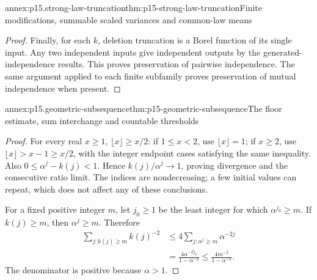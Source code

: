 \begin{annexitem}{annex:p15.strong-law-truncation}{thm:p15-strong-law-truncation}{Finite modifications, summable scaled variances and common-law means}
\begin{proof}
Finally, for each \(k\), deletion truncation is a Borel function
of its single input. Any two independent inputs give independent
outputs by the generated-independence results. This proves preservation
of pairwise independence. The same argument applied to each finite
subfamily proves preservation of mutual independence when present.
\end{proof}
\end{annexitem}

\begin{annexitem}{annex:p15.geometric-subsequence}{thm:p15-geometric-subsequence}{The floor estimate, sum interchange and countable thresholds}
\begin{proof}
For every real \(x\geq1\), \(\lfloor x\rfloor\geq x/2\):
if \(1\leq x<2\), use \(\lfloor x\rfloor=1\); if \(x\geq2\),
use \(\lfloor x\rfloor>x-1\geq x/2\), with the integer endpoint
cases satisfying the same inequality. Also
\(0\leq\alpha^j-k(j)<1\). Hence
\(k(j)/\alpha^j\to1\), proving divergence and the consecutive
ratio limit. The indices are nondecreasing; a few initial values can
repeat, which does not affect any of these conclusions.

For a fixed positive integer \(m\), let \(j_0\geq1\) be the
least integer for which \(\alpha^{j_0}\geq m\). If
\(k(j)\geq m\), then \(\alpha^j\geq m\). Therefore
\[
 \begin{aligned}
 \sum_{j:k(j)\geq m}k(j)^{-2}
 &\leq4\sum_{j:\alpha^j\geq m}\alpha^{-2j}\\
 &=\frac{4\alpha^{-2j_0}}{1-\alpha^{-2}}
 \leq\frac{4m^{-2}}{1-\alpha^{-2}}.
 \end{aligned}
\]
The denominator is positive because \(\alpha>1\).


\end{proof}
\end{annexitem}
